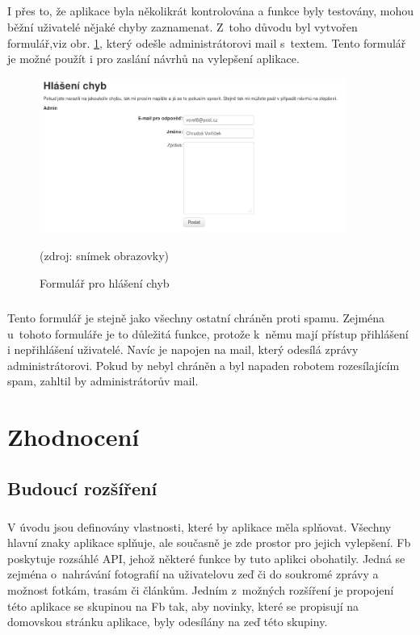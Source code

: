\documentclass[11pt,a4paper,titlepage,oneside]{book}
\begin{document}
		\paragraph{}I přes to, že aplikace byla několikrát kontrolována a funkce byly testovány, mohou běžní uživatelé  nějaké chyby zaznamenat. Z~toho důvodu byl vytvořen formulář,viz obr. \ref{fig:error}, který odešle administrátorovi mail s~textem. Tento formulář je možné použít i pro zaslání návrhů na vylepšení aplikace. 
		\begin{figure}[!h]
			\begin{center}
				\includegraphics[width=10cm]{obrazky/toulavej/error.png}
				\caption{Formulář pro hlášení chyb}
				\label{fig:error}
				(zdroj: snímek obrazovky)
			\end{center}
		\end{figure}	
		\paragraph{}Tento formulář je stejně jako všechny ostatní chráněn proti spamu. Zejména u~tohoto formuláře je to důležitá funkce, protože k~němu mají přístup přihlášení i nepřihlášení uživatelé. Navíc je napojen na mail, který odesílá zprávy administrátorovi. Pokud by nebyl chráněn a byl napaden robotem rozesílajícím spam, zahltil by administrátorův mail.

		

	\chapter{Zhodnocení}
		\section{Budoucí rozšíření}
			\label{sec:budoucnost}
			\paragraph{}V úvodu jsou definovány vlastnosti, které by aplikace měla splňovat. Všechny hlavní znaky aplikace splňuje, ale současně je zde prostor pro jejich vylepšení. \ac{Fb} poskytuje rozsáhlé \ac{API}, jehož některé funkce by tuto aplikci obohatily. Jedná se zejména o~nahrávání fotografií na uživatelovu zeď či do soukromé zprávy a možnost  fotkám, trasám či článkům. Jedním z~možných rozšíření je propojení této aplikace se skupinou na \ac{Fb} tak, aby novinky, které se propisují na domovskou stránku aplikace, byly odesílány na zeď této skupiny.
\end{document}
